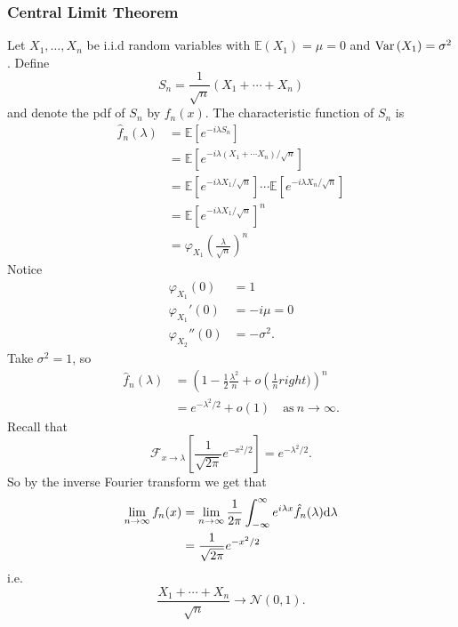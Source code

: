 \documentclass{article}
\begin{document}
\subsubsection{Central Limit Theorem}
Let $ X_1,\dots, X_n $ be i.i.d random variables with $ \mathbb E(X_1)=\mu=0 $ and $ \operatorname{Var}\left({X_1}\right)=\sigma^2 $. Define
\[
	S_n=\frac 1{\sqrt n}(X_1+\cdots + X_n)
\]
and denote the pdf of $ S_n $ by $ f_n(x) $. The characteristic function of $ S_n $ is
\begin{align*}
	\hat f_n(\lambda)&=\mathbb E[e^{-i\lambda S_n}]\\
			 &= \mathbb E[e^{-i\lambda(X_1+\cdots X_n)/\sqrt n}]\\
			 &= \mathbb E[e^{-i\lambda X_1/\sqrt n}]\cdots \mathbb E[e^{-i\lambda X_n/\sqrt n}]\\
			 &=\mathbb E[e^{-i\lambda X_1/\sqrt n}]^n\\
			 &=\varphi_{X_1}(\frac \lambda{\sqrt n})^n
\end{align*}
Notice
\begin{align*}
	\varphi_{X_1}(0)&=1\\
	\varphi_{X_1}'(0)&=-i\mu=0\\
	\varphi_{X_2}''(0)&=-\sigma^2.
\end{align*}
Take $ \sigma^2 = 1 $, so
\begin{align*}
	\hat f_n(\lambda)&=\left(1-\frac 12\frac{\lambda^2}n+o\left(\frac 1nright)\right)^n\\
			 &= e^{-\lambda^2/2}+o(1)\quad\text{as}\ n \to\infty.
\end{align*}
Recall that
\[
	\mathcal F_{x\to \lambda}\left[\frac 1{\sqrt{2\pi}}e^{-x^2/2}\right]=e^{-\lambda^2/2}.
\]
So by  the inverse Fourier transform we get that 
\begin{align*}
	\lim_{n\to \infty} f_n(x)&=\lim_{n\to \infty}\frac 1{2\pi}\int_{-\infty}^\infty e^{i\lambda x}\hat f_n(\lambda)\mathrm d\lambda \\
				 &= \frac 1{\sqrt{2\pi}}e^{-x^2/2}
\end{align*}
i.e.
\[
	\frac{X_1+\cdots + X_n}{\sqrt n}\to \mathcal N(0,1).
\]
\end{document}
